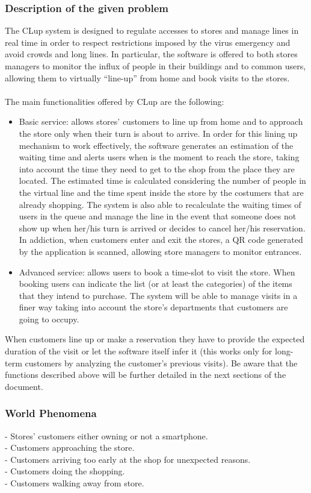 \documentclass{article}
\begin{document}
\subsubsection{Description of the given problem}
The CLup system is designed to regulate accesses to stores and manage lines in real time in order to respect restrictions imposed by the virus emergency and avoid crowds and long lines. In particular, the software is offered to both stores managers to monitor the influx of people in their buildings and to common users, allowing them to virtually “line-up” from home and book visits to the stores.\\
\smallskip\\
The main functionalities offered by CLup are the following:\\
\begin{itemize}
\item Basic service: allows stores' customers to line up from home and to approach the store only when their turn is about to arrive. In order for this lining up mechanism to work effectively, the software generates an estimation of the waiting time and alerts users when is the moment to reach the store, taking into account the time they need to get to the shop from the place they are located. The estimated time is calculated considering the number of people in the virtual line and the time spent inside the store by the costumers that are already shopping. The system is also able to recalculate the waiting times of users in the queue and manage the line in the event that someone does not show up when her/his turn is arrived or decides to cancel her/his reservation. In addiction, when customers enter and exit the stores, a QR code generated by the application is scanned, allowing store managers to monitor entrances.
\item Advanced service: allows users to book a time-slot to visit the store. When booking users can indicate the list (or at least the categories) of the items that they intend to purchase. The system will be able to manage visits in a finer way taking into account the store's departments that customers are going to occupy.
\end{itemize}
When customers line up or make a reservation they have to provide the expected duration of the visit or let the software itself infer it (this works only for long-term customers by analyzing the customer’s previous visits).
Be aware that the functions described above will be further detailed in the next sections of the document.
\subsubsection{World Phenomena}
\noindent\medskip
[WP1] - Stores’ customers either owning or not a smartphone.\\
\noindent\medskip
[WP2] - Customers approaching the store.\\
\noindent\medskip
[WP3] - Customers arriving too early at the shop for unexpected reasons.\\
\noindent\medskip
[WP4] - Customers doing the shopping.\\
\noindent\medskip
[WP5] - Customers walking away from store.
\end{document}
